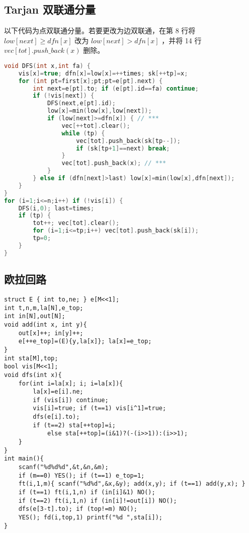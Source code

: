 \documentclass{article}
\begin{document}
\subsection{Tarjan 双联通分量}

以下代码为点双联通分量。若要更改为边双联通，在第 8 行将 $low[next] \geq dfn[x]$ 改为 $low[next] > dfn[x]$ ，并将 14 行 $vec[tot].push\_back(x)$ 删除。

\begin{lstlisting}[language=C++]
void DFS(int x,int fa) {
	vis[x]=true; dfn[x]=low[x]=++times; sk[++tp]=x;
	for (int pt=first[x];pt;pt=e[pt].next) {
		int next=e[pt].to; if (e[pt].id==fa) continue;
		if (!vis[next]) {
			DFS(next,e[pt].id);
			low[x]=min(low[x],low[next]);
			if (low[next]>=dfn[x]) { // ***
				vec[++tot].clear();
				while (tp) {
					vec[tot].push_back(sk[tp--]);
					if (sk[tp+1]==next) break;
				}
				vec[tot].push_back(x); // ***
			}
		} else if (dfn[next]>last) low[x]=min(low[x],dfn[next]);
	}
}
for (i=1;i<=n;i++) if (!vis[i]) {
	DFS(i,0); last=times;
	if (tp)	{
		tot++; vec[tot].clear();
		for (i=1;i<=tp;i++) vec[tot].push_back(sk[i]);
		tp=0;
	}
}
\end{lstlisting}

\subsection{欧拉回路}
\begin{lstlisting}
struct E { int to,ne; } e[M<<1];
int t,n,m,la[N],e_top;
int in[N],out[N];
void add(int x, int y){
	out[x]++; in[y]++;
	e[++e_top]=(E){y,la[x]}; la[x]=e_top;
}
int sta[M],top;
bool vis[M<<1];
void dfs(int x){
	for(int i=la[x]; i; i=la[x]){
		la[x]=e[i].ne;
		if (vis[i]) continue;
		vis[i]=true; if (t==1) vis[i^1]=true;		
		dfs(e[i].to);
		if (t==2) sta[++top]=i;
			else sta[++top]=(i&1)?(-(i>>1)):(i>>1);
	}
}
int main(){
	scanf("%d%d%d",&t,&n,&m);
	if (m==0) YES(); if (t==1) e_top=1;
	ft(i,1,m){ scanf("%d%d",&x,&y); add(x,y); if (t==1) add(y,x); }
	if (t==1) ft(i,1,n) if (in[i]&1) NO();
	if (t==2) ft(i,1,n) if (in[i]!=out[i]) NO();
	dfs(e[3-t].to); if (top!=m) NO();
	YES(); fd(i,top,1) printf("%d ",sta[i]);
}
\end{lstlisting}
\end{document}
